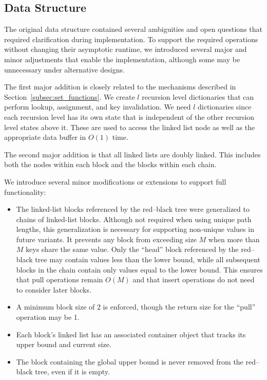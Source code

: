 \documentclass[ijoc,blindrev]{informs3} %
\begin{document}
\begin{APPENDICES}
\section{Data Structure}\label{app:data_structure}

The original data structure contained several ambiguities and open questions that required clarification during implementation. To support the required operations without changing their asymptotic runtime, we introduced several major and minor adjustments that enable the implementation, although some may be unnecessary under alternative designs.

The first major addition is closely related to the mechanisms described in Section~\ref{subsec:set_functions}. We create $l$ recursion level dictionaries that can perform lookup, assignment, and key invalidation. We need $l$ dictionaries since each recursion level has its own state that is independent of the other recursion level states above it. These are used to access the linked list node as well as the appropriate data buffer in $O(1)$ time.


The second major addition is that all linked lists are doubly linked. This includes both the nodes within each block and the blocks within each chain.

We introduce several minor modifications or extensions to support full functionality:
\begin{itemize}
    \item The linked-list blocks referenced by the red–black tree were generalized to chains of linked-list blocks. Although not required when using unique path lengths, this generalization is necessary for supporting non-unique values in future variants. It prevents any block from exceeding size $M$ when more than $M$ keys share the same value. Only the ``head'' block referenced by the red–black tree may contain values less than the lower bound, while all subsequent blocks in the chain contain only values equal to the lower bound. This ensures that pull operations remain $O(M)$ and that insert operations do not need to consider later blocks.
    \item A minimum block size of 2 is enforced, though the return size for the ``pull'' operation may be 1.
    \item Each block’s linked list has an associated container object that tracks its upper bound and current size.
    \item The block containing the global upper bound is never removed from the red–black tree, even if it is empty.
\end{itemize}



\end{APPENDICES}
\end{document}
